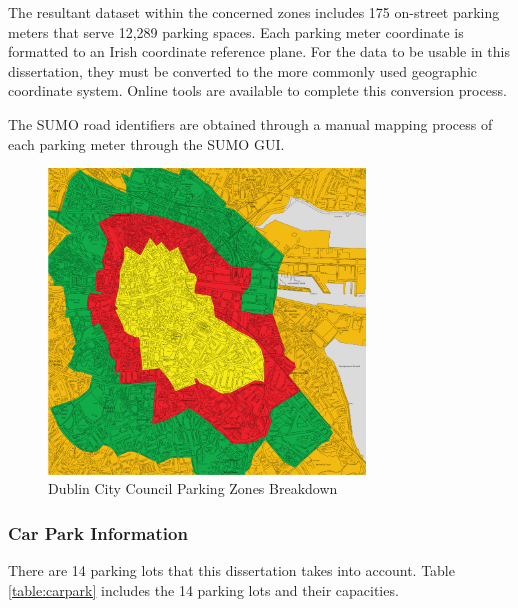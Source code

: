 The resultant dataset within the concerned zones includes 175 on-street parking meters that serve 12,289 parking spaces. Each parking meter coordinate is formatted to an Irish coordinate reference plane. For the data to be usable in this dissertation, they must be converted to the more commonly used geographic coordinate system. Online tools are available to complete this conversion process.

The SUMO road identifiers are obtained through a manual mapping process of each parking meter through the SUMO GUI.

\begin{figure}[H]
    \centering
    \includegraphics[width=0.75\textwidth]{./Images/DUBLINZONES.PNG}
    \caption{Dublin City Council Parking Zones Breakdown}
    \label{fig:DUBLINZONES}
\end{figure}

\pagebreak 

\subsubsection{Car Park Information}\label{ssec:car_par_cap}
There are 14 parking lots that this dissertation takes into account. Table \ref{table:carpark} includes the 14 parking lots and their capacities.

